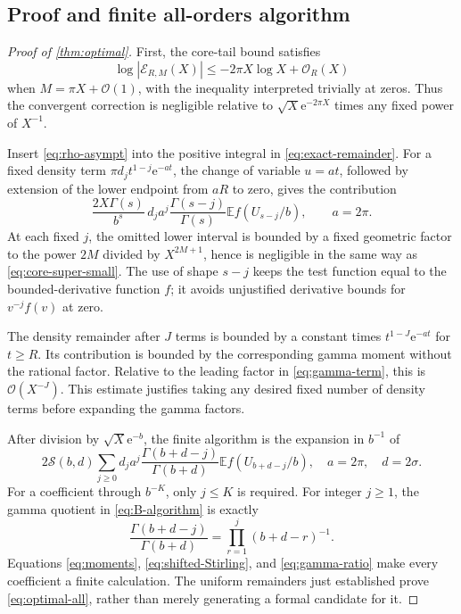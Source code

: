 \documentclass[11pt,a4paper]{article}
\theoremstyle{definition}
\numberwithin{equation}{section}
\newcommand{\ee}{\mathrm{e}}
\newcommand{\Oh}{\mathcal O}
\newcommand{\E}{\mathbb E}
\begin{document}
\subsection{Proof and finite all-orders algorithm}
\begin{proof}[Proof of \cref{thm:optimal}]
First, the core-tail bound satisfies
\begin{equation}
 \log|\mathcal E_{R,M}(X)|\le-2\pi X\log X+\Oh_R(X)
 \label{eq:core-super-small}
\end{equation}
when $M=\pi X+\Oh(1)$, with the inequality interpreted trivially at zeros. Thus the convergent correction is negligible relative to $\sqrt X\ee^{-2\pi X}$ times any fixed power of $X^{-1}$.

Insert \eqref{eq:rho-asympt} into the positive integral in \eqref{eq:exact-remainder}. For a fixed density term $\pi d_jt^{1-j}\ee^{-at}$, the change of variable $u=at$, followed by extension of the lower endpoint from $aR$ to zero, gives the contribution
\begin{equation}
 \frac{2X\Gamma(s)}{b^s}\,
 d_ja^j\frac{\Gamma(s-j)}{\Gamma(s)}
 \E f(U_{s-j}/b),\qquad a=2\pi.
 \label{eq:gamma-term}
\end{equation}
At each fixed $j$, the omitted lower interval is bounded by a fixed geometric factor to the power $2M$ divided by $X^{2M+1}$, hence is negligible in the same way as \eqref{eq:core-super-small}. The use of shape $s-j$ keeps the test function equal to the bounded-derivative function $f$; it avoids unjustified derivative bounds for $v^{-j}f(v)$ at zero.

The density remainder after $J$ terms is bounded by a constant times
$t^{1-J}\ee^{-at}$ for $t\ge R$. Its contribution is bounded by the corresponding gamma moment without the rational factor. Relative to the leading factor in \eqref{eq:gamma-term}, this is $\Oh(X^{-J})$. This estimate justifies taking any desired fixed number of density terms before expanding the gamma factors.

After division by $\sqrt X\ee^{-b}$, the finite algorithm is the expansion in $b^{-1}$ of
\begin{equation}
 2\mathcal S(b,d)
 \sum_{j\ge0}d_ja^j
       \frac{\Gamma(b+d-j)}{\Gamma(b+d)}
          \E f(U_{b+d-j}/b),
 \quad a=2\pi,\quad d=2\sigma.
 \label{eq:B-algorithm}
\end{equation}
For a coefficient through $b^{-K}$, only $j\le K$ is required. For integer $j\ge1$, the gamma quotient in \eqref{eq:B-algorithm} is exactly
\begin{equation}
 \frac{\Gamma(b+d-j)}{\Gamma(b+d)}
       =\prod_{r=1}^j(b+d-r)^{-1}.
 \label{eq:gamma-ratio}
\end{equation}
Equations \eqref{eq:moments}, \eqref{eq:shifted-Stirling}, and \eqref{eq:gamma-ratio} make every coefficient a finite calculation. The uniform remainders just established prove \eqref{eq:optimal-all}, rather than merely generating a formal candidate for it.


\end{proof}
\end{document}
